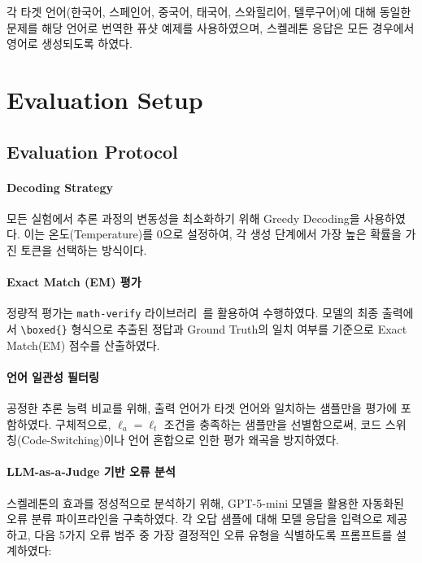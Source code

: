 각 타겟 언어(한국어, 스페인어, 중국어, 태국어, 스와힐리어, 텔루구어)에 대해 동일한 문제를 해당 언어로 번역한 퓨샷 예제를 사용하였으며, 스켈레톤 응답은 모든 경우에서 영어로 생성되도록 하였다.


\section{Evaluation Setup}\label{Appendix:Evaluation-setup}

\subsection{Evaluation Protocol}\label{Appendix:Evaluation-protocol}

\paragraph{Decoding Strategy}
모든 실험에서 추론 과정의 변동성을 최소화하기 위해 Greedy Decoding을 사용하였다. 이는 온도(Temperature)를 0으로 설정하여, 각 생성 단계에서 가장 높은 확률을 가진 토큰을 선택하는 방식이다.

\paragraph{Exact Match (EM) 평가}
정량적 평가는 \texttt{math-verify} 라이브러리~\citep{mathverify}를 활용하여 수행하였다. 모델의 최종 출력에서 \verb|\boxed{}| 형식으로 추출된 정답과 Ground Truth의 일치 여부를 기준으로 Exact Match(EM) 점수를 산출하였다.

\paragraph{언어 일관성 필터링}
공정한 추론 능력 비교를 위해, 출력 언어가 타겟 언어와 일치하는 샘플만을 평가에 포함하였다. 구체적으로, $\ell_a = \ell_t$ 조건을 충족하는 샘플만을 선별함으로써, 코드 스위칭(Code-Switching)이나 언어 혼합으로 인한 평가 왜곡을 방지하였다.

\paragraph{LLM-as-a-Judge 기반 오류 분석}
\label{sec:llm-as-a-judge}
스켈레톤의 효과를 정성적으로 분석하기 위해, GPT-5-mini 모델을 활용한 자동화된 오류 분류 파이프라인을 구축하였다. 각 오답 샘플에 대해 모델 응답을 입력으로 제공하고, 다음 5가지 오류 범주 중 가장 결정적인 오류 유형을 식별하도록 프롬프트를 설계하였다:

